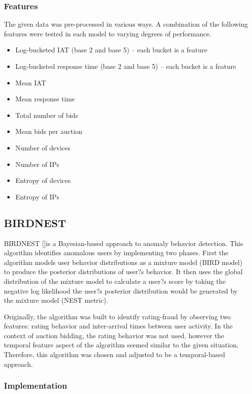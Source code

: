 \documentclass{article} %
\begin{document}
\subsubsection{Features}

The given data was pre-processed in various ways.
A combination of the following features were tested in each model to varying degrees of performance.

\begin{itemize}
\item Log-bucketed IAT (base 2 and base 5) -- each bucket is a feature
\item Log-bucketed response time (base 2 and base 5) -- each bucket is a feature
\item Mean IAT
\item Mean response time
\item Total number of bids
\item Mean bids per auction
\item Number of devices
\item Number of IPs
\item Entropy of devices
\item Entropy of IPs
\end{itemize}

\subsection{BIRDNEST}

\quad BIRDNEST [\cite{birdnest}]is a Bayesian-based approach to anomaly behavior detection. This algorithm identifies anomalous users by implementing two phases. First the algorithm models user behavior distributions as a mixture model (BIRD model) to produce the posterior distributions of user?s behavior. It then uses the global distribution of the mixture model to calculate a user?s score by taking the negative log likelihood the user?s posterior distribution would be generated by the mixture model (NEST metric).

\quad Originally, the algorithm was built to identify rating-fraud by observing two features: rating behavior and inter-arrival times between user activity. In the context of auction bidding, the rating behavior was not used, however the temporal feature aspect of the algorithm seemed similar to the given situation. Therefore, this algorithm was chosen and adjusted to be a temporal-based approach.
	
\subsubsection{Implementation}
\end{document}
